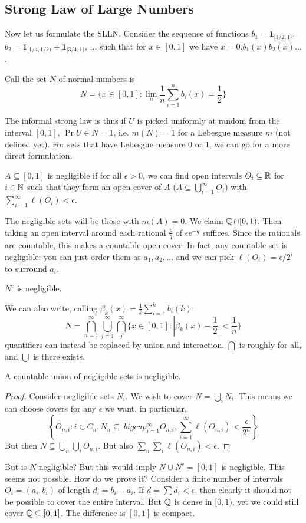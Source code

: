\subsection{Strong Law of Large Numbers}
Now let us formulate the SLLN. Consider the sequence of functions $b_1 = \mathbf{1}_{[1/2, 1)}$, $b_2 = \mathbf{1}_{[1/4, 1/2)} + \mathbf{1}_{[3/4, 1)}$, $\dots$
such that for $x \in [0, 1]$ we have $x = 0.b_1(x) b_2(x) \dots$.
\begin{definition}
Call the set $N$ of normal numbers is
\[ N = \{x \in [0, 1] : \lim_n \frac{1}{n} \sum_{i = 1}^n b_i(x) = \frac12\} \]
\end{definition}
The informal strong law is thus if $U$ is picked uniformly at random from the interval $[0, 1]$,
$\Pr{U \in N} = 1$, i.e. $m(N) = 1$ for a Lebesgue measure $m$ (not defined yet). For sets that have Lebesgue measure
$0$ or $1$, we can go for a more direct formulation.
\begin{definition}
    $A \subseteq [0, 1]$ is negligible if for all $\epsilon > 0$, we can find open intervals $O_i \subseteq \operatorname{\mathbb{R}}$ for $i \in \operatorname{\mathbb{N}}$ such that they
    form an open cover of $A$ ($A \subseteq \bigcup_{i = 1}^{\infty} O_i$) with $\sum_{i = 1}^{\infty} \ell(O_i) < \epsilon$.
\end{definition}
The negligible sets will be those with $m(A) = 0$. We claim $\operatorname{\mathbb{Q}} \cap [0, 1)$. Then taking an open interval around each rational $\frac{p}{q}$
of 
$\epsilon e^{-q}$ suffices. Since the rationals are countable, this makes a countable open cover. In fact, any countable set
is negligible; you can just order them as $a_1, a_2, \dots$ and we can pick $\ell(O_i) = \epsilon/2^i$ to surround $a_i$.
\begin{theorem}
    $N^c$ is negligible.
\end{theorem}
We can also write, calling $\beta_k(x) = \frac{1}{k} \sum_{i = 1}^k b_i(k)$:
\[ N = \bigcap_{n = 1}^{\infty} \bigcup_{j = 1}^{\infty} \bigcap_{j}^{\infty} \{ x \in [0, 1] : |\beta_k(x) - \frac{1}{2}| < \frac{1}{n} \}\]
quantifiers can instead be replaced by union and interaction. $\bigcap$ is roughly for all, and $\bigcup$ is there exists.
\begin{theorem}
    A countable union of negligible sets is negligible.
    \begin{proof}
        Consider negligible sets $N_i$. We wish to cover $N = \bigcup_i N_i$.
        This means we can choose covers for any $\epsilon$ we want, in particular,
        \[ \left\{ O_{n, i} : i \in C_n, N_n \subseteq \ bigcup_{i = 1}^{\infty} O_{n, i}, \sum_{i = 1}^{\infty} \ell(O_{n, i}) < \frac{\epsilon}{2^n} \right\} \]
        But then $N \subseteq \bigcup_n \bigcup_i O_{n, i}$. But also $\sum_{n} \sum_{i} \ell(O_{n, i}) < \epsilon$.
    \end{proof}
\end{theorem}
But is $N$ negligible? But this would imply $N \cup N^c = [0, 1]$ is negligible. This seems
not possble. How do we prove it? Consider a finite number of intervals $O_i = (a_i, b_i)$ of length $d_i = b_i - a_i$.
If $d = \sum d_i < \epsilon$, then clearly it should not be possible to cover the entire interval. But $\operatorname{\mathbb{Q}}$ is dense in $[0, 1)$,
yet we could still cover $\operatorname{\mathbb{Q}} \subseteq [0, 1]$. The difference is $[0, 1]$ is compact.
